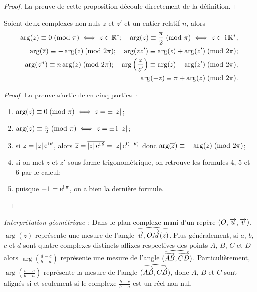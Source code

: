 \begin{proof}
  La preuve de cette proposition découle directement de la définition.
\end{proof}

\begin{prop}
  Soient deux complexes non nuls \(z\) et \(z'\) et un entier relatif \(n\), 
  alors
  \begin{align*}
    \arg(z) \equiv 0\!\pmod {\pi} \iff z \in{}\mathbb{R}^*; \quad 
    \arg(z) \equiv \frac{\pi}{2}\!\pmod {\pi} \iff z \in{}\operatorname{i}\mathbb{R}^{*};\\
    \arg(\overline{z}) \equiv -\arg(z)\!\pmod {2\pi}; \quad \arg(z 
    z') \equiv \arg(z) + \arg(z')\!\pmod {2\pi}; \\
    \arg(z^n) \equiv n \arg(z)\!\pmod {2\pi}; \quad \arg 
    \left(\frac{z}{z'} \right) \equiv \arg(z) - \arg(z') \!\pmod {2\pi}; \\
    \arg(-z) \equiv \pi + \arg(z)\!\pmod {2\pi}.
  \end{align*}
\end{prop}

\begin{proof}
  La preuve s'articule en cinq parties~:
  \begin{enumerate}
    \item \(\arg(z) \equiv 0\!\pmod {\pi} \iff z = \pm \left\lvert z\right\rvert\);
    \item \(\arg(z) \equiv \frac{\pi}{2}\!\pmod {\pi} \iff z = \pm \operatorname{i}{}\left\lvert z\right\rvert\);
    \item si \(z = \left\lvert z\right\rvert \operatorname{e}^{\operatorname{i} \theta}\), alors \(\overline{z} = 
      \overline{|z| \operatorname{e}^{\operatorname{i} \theta}} = |z| \operatorname{e}^{\operatorname{i} (-\theta)}\) donc 
      \(\arg(\overline{z}) \equiv -\arg(z)\!\pmod {2\pi}\);
    \item si on met \(z\) et \(z'\) sous forme trigonométrique, on retrouve 
      les formules 4, 5 et 6 par le calcul;
    \item puisque \(-1 = \operatorname{e}^{\operatorname{i} \pi}\), on a bien la dernière formule.
  \end{enumerate}
\end{proof}

\emph{Interprétation géométrique}~: Dans le plan complexe muni d'un repère 
\((O,\overrightarrow{u}, \overrightarrow{v})\), \(\arg(z)\) représente une mesure de l'angle 
\(\widehat{\overrightarrow{u}, \overrightarrow{OM}(z)}\). Plus généralement, si \(a\), \(b\), \(c\) 
et \(d\) sont quatre complexes distincts affixes respectives des points \(A\), 
\(B\), \(C\) et \(D\) alors \(\arg\left(\frac{d-c}{b-a}\right)\) représente une 
mesure de l'angle \((\widehat{\overrightarrow{AB},\overrightarrow{CD}})\). Particulièrement, 
\(\arg\left(\frac{b-c}{b-a}\right)\) représente la mesure de l'angle 
\((\widehat{\overrightarrow{AB},\overrightarrow{CB}})\), donc \(A\), \(B\) et \(C\) sont alignés si 
et seulement si le complexe \(\frac{b-c}{b-a}\) est un réel non nul.

